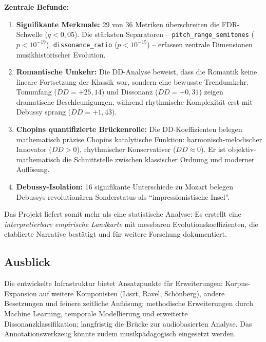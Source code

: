 \documentclass[12pt,a4paper]{article}
\theoremstyle{definition}
\begin{document}
\textbf{Zentrale Befunde:}
\begin{enumerate}
    \item \textbf{Signifikante Merkmale:} 29 von 36 Metriken überschreiten die FDR-Schwelle ($q<0{,}05$). Die stärksten Separatoren -- \texttt{pitch\_range\_semitones} ($p<10^{-19}$), \texttt{dissonance\_ratio} ($p<10^{-15}$) -- erfassen zentrale Dimensionen musikhistorischer Evolution.
    
    \item \textbf{Romantische Umkehr:} Die DD-Analyse beweist, dass die Romantik keine lineare Fortsetzung der Klassik war, sondern eine bewusste Trendumkehr. Tonumfang ($DD = +25{,}14$) und Dissonanz ($DD = +0{,}31$) zeigen dramatische Beschleunigungen, während rhythmische Komplexität erst mit Debussy sprang ($DD = +1{,}43$).
    
    \item \textbf{Chopins quantifizierte Brückenrolle:} Die DD-Koeffizienten belegen mathematisch präzise Chopins katalytische Funktion: harmonisch-melodischer Innovator ($DD > 0$), rhythmischer Konservativer ($DD \approx 0$). Er ist objektiv-mathematisch die Schnittstelle zwischen klassischer Ordnung und moderner Auflösung.
    
    \item \textbf{Debussy-Isolation:} 16 signifikante Unterschiede zu Mozart belegen Debussys revolutionären Sonderstatus als \enquote{impressionistische Insel}.
\end{enumerate}

Das Projekt liefert somit mehr als eine statistische Analyse: Es erstellt eine \emph{interpretierbare empirische Landkarte} mit messbaren Evolutionskoeffizienten, die etablierte Narrative bestätigt und für weitere Forschung dokumentiert.

\subsection{Ausblick}
Die entwickelte Infrastruktur bietet Ansatzpunkte für Erweiterungen: Korpus-Expansion auf weitere Komponisten (Liszt, Ravel, Schönberg), andere Besetzungen und feinere zeitliche Auflösung; methodische Erweiterungen durch Machine Learning, temporale Modellierung und erweiterte Dissonanzklassifikation; langfristig die Brücke zur audiobasierten Analyse. Das Annotationswerkzeug könnte zudem musikpädagogisch eingesetzt werden.
\end{document}
